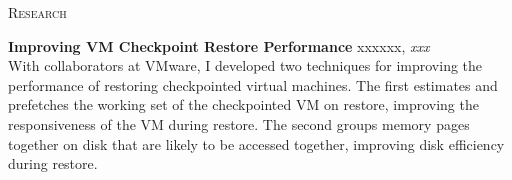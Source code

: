 \documentclass[10pt,times]{report}
\newlength{\sectiongap}
\newlength{\entrygap}
\newlength{\sectioncolwidth}
\newlength{\colgap}
\newlength{\stuffwidth}
\def\ifEqString#1#2{\def\testa{#1}\def\testb{#2}%
  \ifx\testa\testb}
\newenvironment{rtable}{
  \begin{minipage}{\textwidth}
  }{
  \end{minipage}
}
\newenvironment{rentry}[3][xxx]{
  \begin{minipage}[t]{\hsize}
    \textbf{#2}\ifEqString{#1}{xxx}\relax\else, \textit{#1}\fi
    \hspace{\stretch{1}} #3 \\
  }{
    \removelastskip
  \end{minipage}
  \\[\entrygap]  %
}
\newenvironment{rsection}[1]{
  \begin{minipage}[t]{\sectioncolwidth}
    \textsc{#1}
  \end{minipage}
  \hspace{\colgap}
  \begin{minipage}[t]{\stuffwidth}
  }{
    \removelastskip
  \end{minipage}
  \\[\sectiongap]
}
\begin{document}
\begin{rtable}
\begin{rsection}{Research}
    \begin{rentry}{Improving VM Checkpoint Restore Performance}{} 
      With collaborators at VMware, I developed two techniques for
      improving the performance of restoring checkpointed virtual
      machines. The first estimates and prefetches the working set of
      the checkpointed VM on restore, improving the responsiveness of
      the VM during restore. The second groups memory pages together
      on disk that are likely to be accessed together, improving disk
      efficiency during restore.
    \end{rentry}


  \end{rsection}
\end{rtable}
\end{document}
